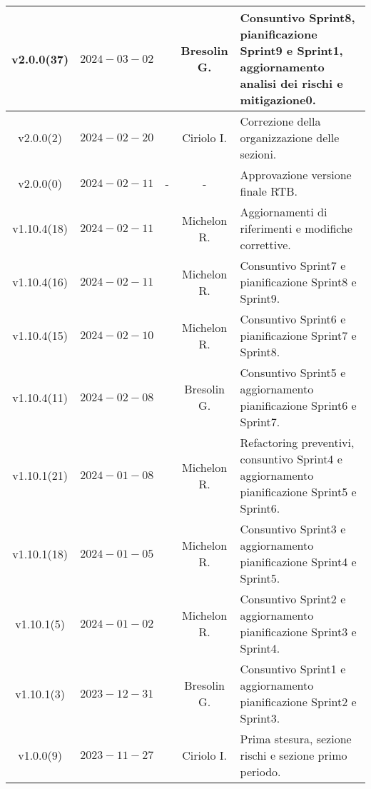 {\begin{xltabular}{\textwidth}{c|c|c|c|X}
\endlastfoot
\hline
v2.0.0(37) & $2024-03-02$ &  & Bresolin G. & Consuntivo Sprint8, pianificazione Sprint9 e Sprint1, aggiornamento analisi dei rischi e mitigazione0.\\
\hline
v2.0.0(2) & $2024-02-20$ &  & Ciriolo I. & Correzione della organizzazione delle sezioni.\\
\hline
v2.0.0(0) & $2024-02-11$ & - & - & Approvazione versione finale RTB.\\
\hline
v1.10.4(18) & $2024-02-11$ &  & Michelon R. & Aggiornamenti di riferimenti e modifiche correttive.\\
\hline
v1.10.4(16) & $2024-02-11$ &  & Michelon R. & Consuntivo Sprint7 e pianificazione Sprint8 e Sprint9.\\
\hline
v1.10.4(15) & $2024-02-10$ &  & Michelon R. & Consuntivo Sprint6 e pianificazione Sprint7 e Sprint8.\\
\hline
v1.10.4(11) & $2024-02-08$ &  & Bresolin G. & Consuntivo Sprint5 e aggiornamento pianificazione Sprint6 e Sprint7.\\
\hline
v1.10.1(21) & $2024-01-08$ &  & Michelon R. & Refactoring preventivi, consuntivo Sprint4 e aggiornamento pianificazione Sprint5 e Sprint6.\\
\hline
v1.10.1(18) & $2024-01-05$ &  & Michelon R. & Consuntivo Sprint3 e aggiornamento pianificazione Sprint4 e Sprint5.\\
\hline
v1.10.1(5) & $2024-01-02$ &  & Michelon R. & Consuntivo Sprint2 e aggiornamento pianificazione Sprint3 e Sprint4.\\
\hline
v1.10.1(3) & $2023-12-31$ &  & Bresolin G. & Consuntivo Sprint1 e aggiornamento pianificazione Sprint2 e Sprint3.\\
\hline
v1.0.0(9) & $2023-11-27$ &  & Ciriolo I. & Prima stesura, sezione rischi e sezione primo periodo.
    
\end{xltabular}}